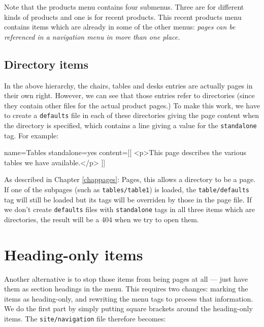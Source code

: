 Note that the products menu contains four submenus. Three are for different kinds of products
and one is for recent products. This recent products menu contains items which are already in
some of the other menus: \emph{pages can be referenced in a navigation menu in more than one place.}

\subsection{Directory items}
In the above hierarchy, the chairs, tables and desks entries are actually
pages in their own right. However, we can see that those entries refer to
directories (since they contain other files for the actual product pages.) To
make this work, we have to create a \texttt{defaults} file in each of these
directories giving the page content when the directory is specified, which
contains a line giving a value for the \texttt{standalone} tag. For example:
\begin{MyVerbatim}
name=Tables
standalone=yes
content=[[
    <p>This page describes the various tables we have available.</p>
]]
\end{MyVerbatim}
As described in Chapter \ref{chappages}: Pages, this allows a directory to be
a page. If one of the subpages (such as \texttt{tables/table1}) is loaded, the
\texttt{table/defaults} tag will still be loaded but its tags will be
overriden by those in the page file.
If we don't create \texttt{defaults} files with \texttt{standalone} tags in
all three items which are directories, the result will be a 404 when we try to
open them.

\section{Heading-only items}
Another alternative is to stop those items from being pages at all --- just
have them as section headings in the menu. This requires two changes: marking
the items as heading-only, and rewriting the menu tags to process that
information. We do the first part by simply putting square brackets around the
heading-only items. The \texttt{site/navigation} file therefore becomes:

